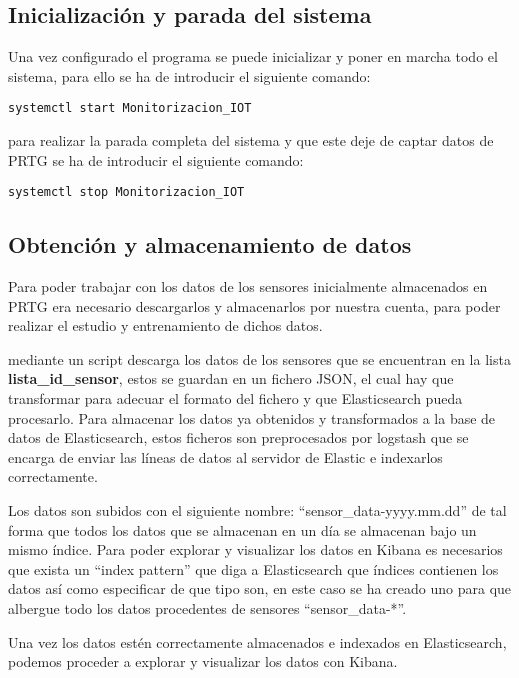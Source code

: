 \subsection{Inicialización y parada del sistema}

Una vez configurado el programa se puede inicializar y poner en marcha todo el sistema, para ello se ha de introducir el siguiente comando:

\begin{lstlisting}[frame=single]  
systemctl start Monitorizacion_IOT
\end{lstlisting}

para realizar la parada completa del sistema y que este deje de captar datos de PRTG se ha de introducir el siguiente comando:

\begin{lstlisting}[frame=single]  
systemctl stop Monitorizacion_IOT
\end{lstlisting}

\subsection{Obtención y almacenamiento de datos}\label{cap:obt_alm_datos}

Para poder trabajar con los datos de los sensores inicialmente almacenados en PRTG era necesario descargarlos y almacenarlos por nuestra cuenta, para poder realizar el estudio y entrenamiento de dichos datos.

\nombrePrograma mediante un script descarga los datos de los sensores que se encuentran en la lista \textbf{lista\_id\_sensor}, estos se guardan en un fichero JSON, el cual hay que transformar para adecuar el formato del fichero y que Elasticsearch pueda procesarlo. Para almacenar los datos ya obtenidos y transformados a la base de datos de Elasticsearch, estos ficheros son preprocesados por logstash que se encarga de enviar las líneas de datos al servidor de Elastic e indexarlos correctamente.

Los datos son subidos con el siguiente nombre: ``sensor\_data-yyyy.mm.dd'' de tal forma que todos los datos que se almacenan en un día se almacenan bajo un mismo índice. Para poder explorar y visualizar los datos en Kibana es necesarios que exista un ``index pattern'' que diga a Elasticsearch que índices contienen los datos así como especificar de que tipo son, en este caso se ha creado uno para que albergue todo los datos procedentes de sensores ``sensor\_data-*''. 

Una vez los datos estén correctamente almacenados e indexados en Elasticsearch, podemos proceder a explorar y visualizar los datos con Kibana.


